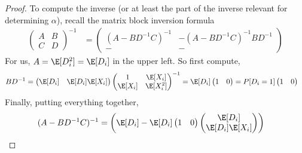 \documentclass[12pt]{article}
\theoremstyle{plain}
\theoremstyle{definition}
\theoremstyle{remark}
\begin{document}
\begin{proof}
To compute the inverse (or at least the part of the inverse relevant
for determining $\alpha$), recall the matrix block inversion formula
\begin{align*}
  \begin{pmatrix}
    A & B \\
    C & D
  \end{pmatrix}^{-1}
  &=
  \begin{pmatrix}
    (A-BD^{-1}C)^{-1}
    & - (A-BD^{-1}C)^{-1} BD^{-1}
    \\
    - & -
  \end{pmatrix}
\end{align*}
For us, $A=\E[D_i^2]=\E[D_i]$ in the upper left.
So first compute,
\begin{align*}
  BD^{-1}
  &=
  \begin{pmatrix}
    \E[D_i] & \E[D_i] \E[X_i]
  \end{pmatrix}
  \begin{pmatrix}
    1       & \E[X_i] \\
    \E[X_i] & \E[X_i^2]
  \end{pmatrix}^{-1}
  =
  \E[D_i]
  \begin{pmatrix}
    1 & 0 \\
  \end{pmatrix}
  =
  P[D_i=1]
  \begin{pmatrix}
    1 & 0 \\
  \end{pmatrix}
\end{align*}
Finally, putting everything together,
\begin{align*}
  (A-BD^{-1}C)^{-1}
  &=
  \left(
  \E[D_i]
  -
  \E[D_i]
  \begin{pmatrix}
    1 & 0 \\
  \end{pmatrix}
  \begin{pmatrix}
    \E[D_i] \\ \E[D_i] \E[X_i]
  \end{pmatrix}
  \right)

\end{align*}
\end{proof}
\end{document}
